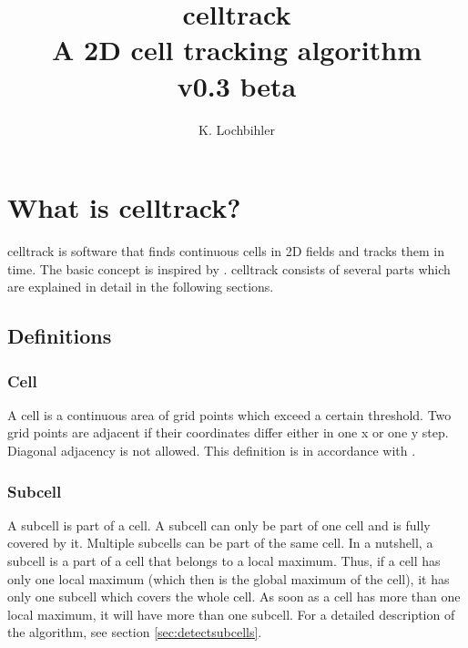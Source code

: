 \documentclass{scrartcl}
\title{celltrack\\
	A 2D cell tracking algorithm\\ \medskip
	v0.3 beta}
\author{K. Lochbihler}
\begin{document}
	
\maketitle

\section{What is celltrack?}
celltrack is software that finds continuous cells in 2D fields and tracks them in time. The basic concept is inspired by \cite{moseley2013}. celltrack consists of several parts which are explained in detail in the following sections.

\subsection{Definitions}

\subsubsection*{Cell}
A cell is a continuous area of grid points which exceed a certain threshold. Two grid points are adjacent if their coordinates differ either in one x or one y step. Diagonal adjacency is not allowed. This definition is in accordance with \cite{moseley2013}.

\subsubsection*{Subcell}
A subcell is part of a cell. A subcell can only be part of one cell and is fully covered by it. Multiple subcells can be part of the same cell. In a nutshell, a subcell is a part of a cell that belongs to a local maximum. Thus, if a cell has only one local maximum (which then is the global maximum of the cell), it has only one subcell which covers the whole cell. As soon as a cell has more than one local maximum, it will have more than one subcell. For a detailed description of the algorithm, see section \ref{sec:detectsubcells}.
\end{document}
